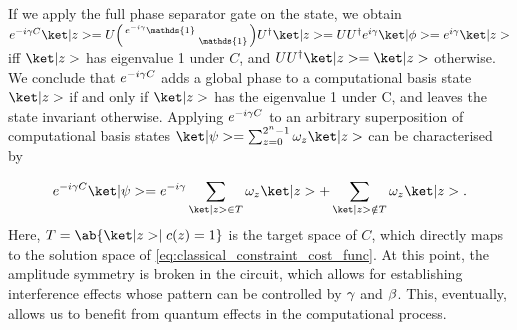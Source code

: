 %

%
If we apply the full phase separator gate on the state, we obtain \(e^{-i \pangle C} \ket|z> = U \begin{psmallmatrix} e^{-i \pangle} \mathds{1} & \\ & \mathds{1} \end{psmallmatrix} U^\dag \ket|z> = UU^\dag e^{i\pangle}\ket|\phi> = e^{i\pangle}\ket|z>\) iff $\ket|z>$ has eigenvalue 1 under $C$, and \(UU^\dag \ket|z> = \ket|z>\) otherwise.
We conclude that $e^{-i \gamma C}$ adds a global phase to a computational basis state $\ket|z>$ if and only if $\ket|z>$ has the eigenvalue 1 under C, and leaves the state invariant
otherwise. Applying $e^{-i \gamma C}$ to an arbitrary superposition of computational basis states $\ket|\psi> = \sum_{z = 0}^{2^n -1} \omega_z \ket|z>$ can be characterised by

\begin{equation}
  e^{-i \pangle C} \ket|\psi> = e^{-i \pangle} \sum_{\ket|z> \in T} \omega_z \ket|z> + \sum_{\ket|z> \notin T} \omega_z \ket|z>.\label{eq:psep}
\end{equation}
%
Here, $T = \ab\{\ket|z> \mid c(z) = 1\}$ is the target space of $C$, which directly maps to the solution space of \cref{eq:classical_constraint_cost_func}. At this point, the amplitude symmetry is broken in the \QAOA circuit, which allows
for establishing interference effects whose pattern
can be controlled by $\gamma$ and $\beta$. This, eventually, allows us
to benefit from quantum effects in the
computational process.

